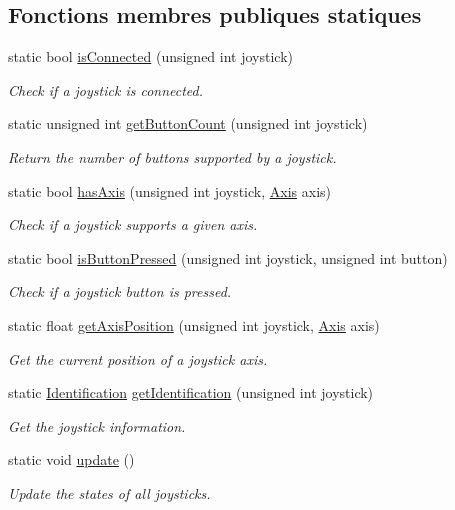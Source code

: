 \subsection*{Fonctions membres publiques statiques}
\begin{DoxyCompactItemize}
\item 
static bool \hyperlink{classsf_1_1Joystick_ac7d4e1923e9f9420174f26703ea63d6c}{is\+Connected} (unsigned int joystick)
\begin{DoxyCompactList}\small\item\em Check if a joystick is connected. \end{DoxyCompactList}\item 
static unsigned int \hyperlink{classsf_1_1Joystick_a4de9f445c6582bfe9f0873f695682885}{get\+Button\+Count} (unsigned int joystick)
\begin{DoxyCompactList}\small\item\em Return the number of buttons supported by a joystick. \end{DoxyCompactList}\item 
static bool \hyperlink{classsf_1_1Joystick_a268e8f2a11ae6af4a47c727cb4ab4d95}{has\+Axis} (unsigned int joystick, \hyperlink{classsf_1_1Joystick_a48db337092c2e263774f94de6d50baa7}{Axis} axis)
\begin{DoxyCompactList}\small\item\em Check if a joystick supports a given axis. \end{DoxyCompactList}\item 
static bool \hyperlink{classsf_1_1Joystick_ae0d97a4b84268cbe6a7078e1b2717835}{is\+Button\+Pressed} (unsigned int joystick, unsigned int button)
\begin{DoxyCompactList}\small\item\em Check if a joystick button is pressed. \end{DoxyCompactList}\item 
static float \hyperlink{classsf_1_1Joystick_aea4930193331df1851b709f3060ba58b}{get\+Axis\+Position} (unsigned int joystick, \hyperlink{classsf_1_1Joystick_a48db337092c2e263774f94de6d50baa7}{Axis} axis)
\begin{DoxyCompactList}\small\item\em Get the current position of a joystick axis. \end{DoxyCompactList}\item 
static \hyperlink{structsf_1_1Joystick_1_1Identification}{Identification} \hyperlink{classsf_1_1Joystick_aa917c9435330e6e0368d3893672d1b74}{get\+Identification} (unsigned int joystick)
\begin{DoxyCompactList}\small\item\em Get the joystick information. \end{DoxyCompactList}\item 
static void \hyperlink{classsf_1_1Joystick_ab85fa9175b4edd3e5a07ee3cde0b0f48}{update} ()
\begin{DoxyCompactList}\small\item\em Update the states of all joysticks. \end{DoxyCompactList}\end{DoxyCompactItemize}


